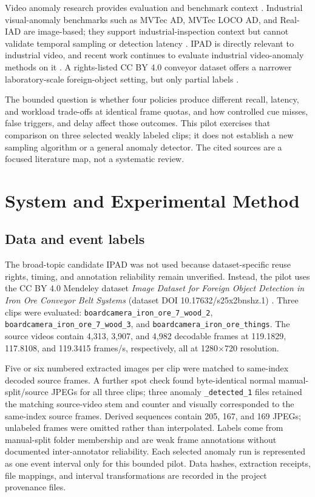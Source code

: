 \documentclass[conference]{IEEEtran}
\begin{document}
Video anomaly research provides evaluation and benchmark context \cite{ramachandra2022survey,acsintoae2022ubnormal,ramachandra2020streetscene}. Industrial visual-anomaly benchmarks such as MVTec AD, MVTec LOCO AD, and Real-IAD are image-based; they support industrial-inspection context but cannot validate temporal sampling or detection latency \cite{bergmann2019mvtec,bergmann2022logical,wang2024realiad}. IPAD is directly relevant to industrial video, and recent work continues to evaluate industrial video-anomaly methods on it \cite{liu2025ipad,yu2025infp}. A rights-listed CC BY 4.0 conveyor dataset offers a narrower laboratory-scale foreign-object setting, but only partial labels \cite{desousa2025conveyor}.

The bounded question is whether four policies produce different recall, latency, and workload trade-offs at identical frame quotas, and how controlled cue misses, false triggers, and delay affect those outcomes. This pilot exercises that comparison on three selected weakly labeled clips; it does not establish a new sampling algorithm or a general anomaly detector. The cited sources are a focused literature map, not a systematic review.

\section{System and Experimental Method}
\subsection{Data and event labels}
The broad-topic candidate IPAD was not used because dataset-specific reuse rights, timing, and annotation reliability remain unverified. Instead, the pilot uses the CC BY 4.0 Mendeley dataset \emph{Image Dataset for Foreign Object Detection in Iron Ore Conveyor Belt Systems} (dataset DOI 10.17632/s25x2bnshz.1) \cite{desousa2025conveyor}. Three clips were evaluated: \texttt{boardcamera\_iron\_ore\_7\_wood\_2}, \texttt{boardcamera\_iron\_ore\_7\_wood\_3}, and \texttt{boardcamera\_iron\_ore\_things}. The source videos contain 4,313, 3,907, and 4,982 decodable frames at 119.1829, 117.8108, and 119.3415 frames/s, respectively, all at 1280$\times$720 resolution.

Five or six numbered extracted images per clip were matched to same-index decoded source frames. A further spot check found byte-identical normal manual-split/source JPEGs for all three clips; three anomaly \texttt{\_detected\_1} files retained the matching source-video stem and counter and visually corresponded to the same-index source frames. Derived sequences contain 205, 167, and 169 JPEGs; unlabeled frames were omitted rather than interpolated. Labels come from manual-split folder membership and are weak frame annotations without documented inter-annotator reliability. Each selected anomaly run is represented as one event interval only for this bounded pilot. Data hashes, extraction receipts, file mappings, and interval transformations are recorded in the project provenance files.
\end{document}
